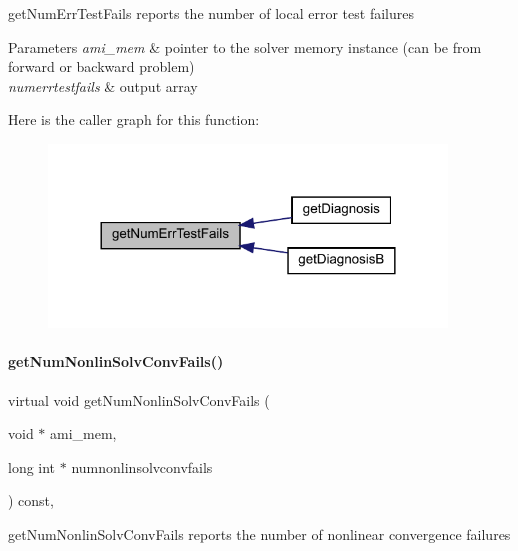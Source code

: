 get\+Num\+Err\+Test\+Fails reports the number of local error test failures


\begin{DoxyParams}{Parameters}
{\em ami\+\_\+mem} & pointer to the solver memory instance (can be from forward or backward problem) \\
\hline
{\em numerrtestfails} & output array \\
\hline
\end{DoxyParams}
Here is the caller graph for this function\+:
\nopagebreak
\begin{figure}[H]
\begin{center}
\leavevmode
\includegraphics[width=300pt]{classamici_1_1_solver_a605fc85e2d8183dca4ebe24f9d810516_icgraph}
\end{center}
\end{figure}
\mbox{\label{classamici_1_1_solver_a34f79927b47e70db74f77943936e18b0}} 
\paragraph{\texorpdfstring{get\+Num\+Nonlin\+Solv\+Conv\+Fails()}{getNumNonlinSolvConvFails()}}
{\footnotesize\ttfamily virtual void get\+Num\+Nonlin\+Solv\+Conv\+Fails (\begin{DoxyParamCaption}\item[{void $\ast$}]{ami\+\_\+mem,  }\item[{long int $\ast$}]{numnonlinsolvconvfails }\end{DoxyParamCaption}) const\hspace{0.3cm}{\ttfamily [protected]}, {}}

get\+Num\+Nonlin\+Solv\+Conv\+Fails reports the number of nonlinear convergence failures


